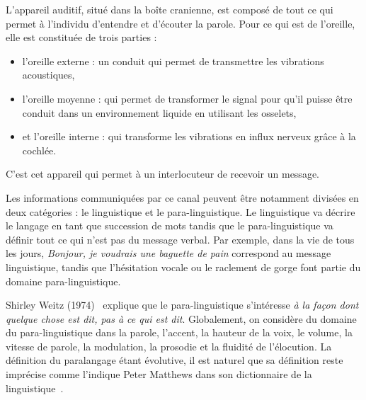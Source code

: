 L'appareil auditif, situé dans la boîte cranienne, est composé de tout ce qui permet à l'individu d'entendre et d'écouter la parole. Pour ce qui est de l'oreille, elle est constituée de trois parties :
\begin{itemize}
  \item l'oreille externe : un conduit qui permet de transmettre les vibrations acoustiques,
  \item l'oreille moyenne : qui permet de transformer le signal pour qu'il puisse être conduit dans un environnement liquide en utilisant les osselets,
  \item et l'oreille interne : qui transforme les vibrations en influx nerveux grâce à la cochlée.
\end{itemize}
C'est cet appareil qui permet à un interlocuteur de recevoir un message.

Les informations communiquées par ce canal peuvent être notamment divisées en deux catégories : le linguistique et le para-linguistique.
Le linguistique va décrire le langage en tant que succession de mots tandis que le para-linguistique va définir tout ce qui n'est pas du message verbal. Par exemple, dans la vie de tous les jours, \textit{Bonjour, je voudrais une baguette de pain} correspond au message linguistique, tandis que l'hésitation vocale ou le raclement de gorge font partie du domaine para-linguistique.

Shirley Weitz (1974)~\cite{Weitz1974} explique que le para-linguistique s'intéresse \textit{à la façon dont quelque chose est dit, pas à ce qui est dit}. Globalement, on considère du domaine du para-linguistique dans la parole, l'accent, la hauteur de la voix, le volume, la vitesse de parole, la modulation, la prosodie et la fluidité de l'élocution.
La définition du paralangage étant évolutive, il est naturel que sa définition reste imprécise comme l'indique Peter Matthews dans son dictionnaire de la linguistique~\cite{Matthews2014}.


